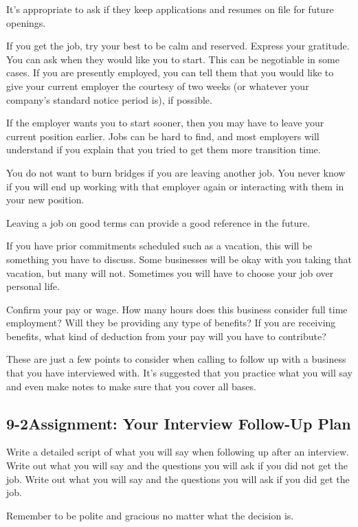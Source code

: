 It's appropriate to ask if they keep applications and resumes on file for future openings.

If you get the job, try your best to be calm and reserved. Express your gratitude. You can ask when they would like you to start. This can be negotiable in some cases. If you are presently employed, you can tell them that you would like to give your current employer the courtesy of two weeks (or whatever your company's standard notice period is), if possible.

If the employer wants you to start sooner, then you may have to leave your current position earlier. Jobs can be hard to find, and most employers will understand if you explain that you tried to get them more transition time.

You do not want to burn bridges if you are leaving another job. You never know if you will end up working with that employer again or interacting with them in your new position.

Leaving a job on good terms can provide a good reference in the future.

If you have prior commitments scheduled such as a vacation, this will be something you have to discuss. Some businesses will be okay with you taking that vacation, but many will not. Sometimes you will have to choose your job over personal life.

Confirm your pay or wage. How many hours does this business consider full time employment? Will they be providing any type of benefits? If you are receiving benefits, what kind of deduction from your pay will you have to contribute?

These are just a few points to consider when calling to follow up with a business that you have interviewed with. It's suggested that you practice what you will say and even make notes to make sure that you cover all bases.

\pagebreak \subsection*{9-2\quad Assignment: Your Interview Follow-Up Plan}
Write a detailed script of what you will say when following up after an interview. Write out what you will say and the questions you will ask if you did not get the job. Write out what you will say and the questions you will ask if you did get the job.

Remember to be polite and gracious no matter what the decision is.

